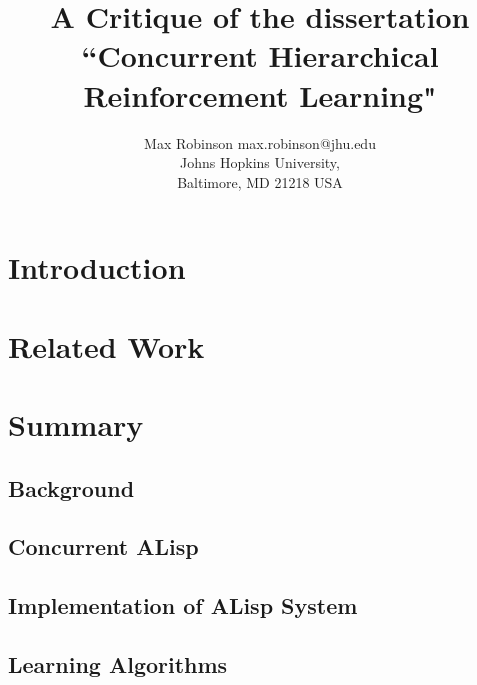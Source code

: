 \documentclass[jair,twoside,11pt,theapa]{article}
\begin{document}
\title{A Critique of the dissertation ``Concurrent Hierarchical Reinforcement Learning"}


\author{\name Max Robinson \email max.robinson@jhu.edu \\
       \addr Johns Hopkins University,\\
       Baltimore, MD 21218 USA
   }


\maketitle


\section{Introduction}
\label{Introduction}
\cite{Marthi:2006}

\section{Related Work}
\label{Related Work}

\section{Summary}

\subsection{Background}
\label{Background}

\subsection{Concurrent ALisp}
\label{CALisp}

\subsection{Implementation of ALisp System}
\label{Implementation}

\subsection{Learning Algorithms}
\label{Learning}
\end{document}

